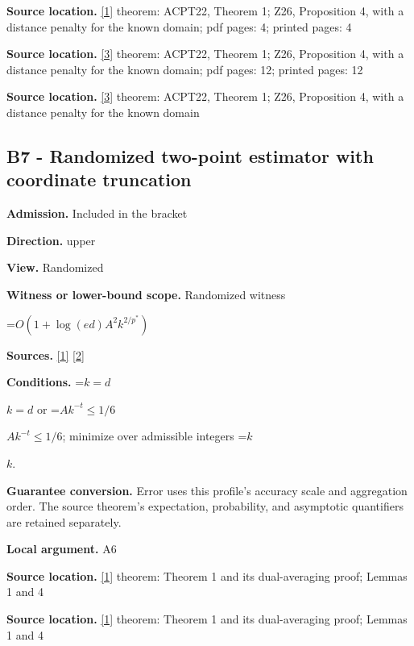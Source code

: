\documentclass[10pt,a4paper]{article}
\newcommand{\AtlasMath}[1]{\par\begingroup\centering\setbox0=\hbox{$\displaystyle #1$}\ifdim\wd0>1.4\linewidth\typeout{ATLAS WIDE FORMULA: \the\wd0}\fi\ifdim\wd0>\linewidth\resizebox{\linewidth}{!}{\box0}\else\box0\fi\par\endgroup}
\newcommand{\AtlasInlineMath}[1]{\begingroup\setbox0=\hbox{$#1$}\ifdim\wd0>.4\linewidth\endgroup\AtlasMath{#1}\else\endgroup$#1$\fi}
\begin{document}
\textbf{Source location.} \href{https://proceedings.neurips.cc/paper_files/paper/2022/file/329ef22fd8cb68223d5df09a037f7dd9-Paper-Conference.pdf}{[1]} theorem: ACPT22, Theorem 1; Z26, Proposition 4, with a distance penalty for the known domain; pdf pages: 4; printed pages: 4

\textbf{Source location.} \href{https://arxiv.org/html/2607.16558v2}{[3]} theorem: ACPT22, Theorem 1; Z26, Proposition 4, with a distance penalty for the known domain; pdf pages: 12; printed pages: 12

\textbf{Source location.} \href{https://arxiv.org/html/2607.16558v2}{[3]} theorem: ACPT22, Theorem 1; Z26, Proposition 4, with a distance penalty for the known domain

\subsection{B7 - Randomized two-point estimator with coordinate truncation}
\textbf{Admission.} Included in the bracket

\textbf{Direction.} upper

\textbf{View.} Randomized

\textbf{Witness or lower-bound scope.} Randomized witness

\AtlasMath{O(1+\log(ed)A^2 k^{2/p^*})}
\textbf{Sources.} \href{https://proceedings.neurips.cc/paper_files/paper/2022/file/329ef22fd8cb68223d5df09a037f7dd9-Paper-Conference.pdf}{[1]} \href{https://arxiv.org/html/2610.00345v1}{[2]}

\textbf{Conditions.} \AtlasInlineMath{k=d} or \AtlasInlineMath{A k^{-t}\le1/6}; minimize over admissible integers \AtlasInlineMath{k}.

\textbf{Guarantee conversion.} Error uses this profile's accuracy scale and aggregation order. The source theorem's expectation, probability, and asymptotic quantifiers are retained separately.

\textbf{Local argument.} A6

\textbf{Source location.} \href{https://proceedings.neurips.cc/paper_files/paper/2022/file/329ef22fd8cb68223d5df09a037f7dd9-Paper-Conference.pdf}{[1]} theorem: Theorem 1 and its dual-averaging proof; Lemmas 1 and 4

\textbf{Source location.} \href{https://proceedings.neurips.cc/paper_files/paper/2022/file/329ef22fd8cb68223d5df09a037f7dd9-Paper-Conference.pdf}{[1]} theorem: Theorem 1 and its dual-averaging proof; Lemmas 1 and 4
\end{document}
